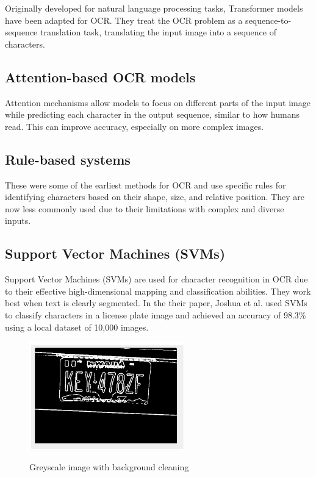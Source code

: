 Originally developed for natural language processing tasks, Transformer models have been adapted for OCR. They treat the OCR problem as a sequence-to-sequence translation task, translating the input image into a sequence of characters.

\subsection{Attention-based OCR models}

Attention mechanisms allow models to focus on different parts of the input image while predicting each character in the output sequence, similar to how humans read. This can improve accuracy, especially on more complex images.

\subsection{Rule-based systems}

These were some of the earliest methods for OCR and use specific rules for identifying characters based on their shape, size, and relative position. They are now less commonly used due to their limitations with complex and diverse inputs.

\subsection{Support Vector Machines (SVMs)}

Support Vector Machines (SVMs) are used for character recognition in OCR due to their effective high-dimensional mapping and classification abilities. They work best when text is clearly segmented. In the their paper, Joshua et al. used SVMs to classify characters in a license plate image and achieved an accuracy of 98.3\% using a local dataset of 10,000 images.\cite{joshuaDevelopmentImageProcessing2023}

\begin{figure}[ht]
    \centering
    \includegraphics[width=0.6\textwidth]{Figures/SVM_Joshua.jpg}
    \caption[Development of an Image Processing Technique for Vehicle Classification using OCR and SVM]{Greyscale image with background cleaning}\cite{joshuaDevelopmentImageProcessing2023}
    \label{fig:Joshua SVM Paper}
\end{figure}






